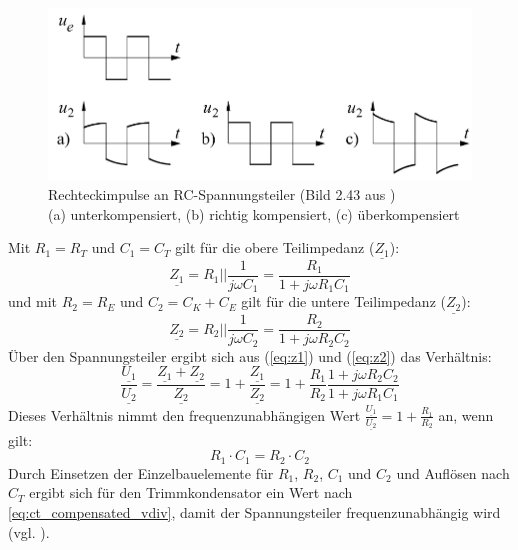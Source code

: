 \documentclass[a4paper, portrait, 12pt]{scrartcl} %
\begin{document}
\begin{figure}[H]
	\centering
		\includegraphics[scale=0.5]{freq_compensated_time_schruefer.png} 
		\caption{\centering Rechteckimpulse an RC-Spannungsteiler (Bild 2.43 aus \cite[S. 106]{Schruefer2022})\\ \footnotesize (a) unterkompensiert, (b) richtig kompensiert, (c) überkompensiert}
	\label{fig:freq_compensated_time}
\end{figure}


Mit $R_1=R_T$ und $C_1=C_T$ gilt für die obere Teilimpedanz ($\underline{Z_1}$):
\begin{equation}
	\underline{Z_1}=R_1||\frac{1}{j\omega C_1}=\frac{R_1}{1+j\omega R_1 C_1}
	\label{eq:z1}
\end{equation}
und mit $R_2=R_E$ und $C_2=C_K+C_E$ gilt für die untere Teilimpedanz ($\underline{Z_2}$):
\begin{equation}
	\underline{Z_2}=R_2||\frac{1}{j\omega C_2}=\frac{R_2}{1+j\omega R_2 C_2}
	\label{eq:z2}
\end{equation}
Über den Spannungsteiler ergibt sich aus (\ref{eq:z1}) und (\ref{eq:z2}) das Verhältnis:
\begin{equation}
	\frac{\underline{U_1}}{\underline{U_2}}=\frac{\underline{Z_1}+\underline{Z_2}}{\underline{Z_2}}=1+\frac{\underline{Z_1}}{\underline{Z_2}}=1+\frac{R_1}{R_2}\frac{1+j\omega R_2 C_2}{1+j\omega R_1 C_1}
	\label{eq:comp_vdiv}
\end{equation}
Dieses Verhältnis nimmt den frequenzunabhängigen Wert $\frac{\underline{U_1}}{\underline{U_2}}=1+\frac{R_1}{R_2}$ an, wenn gilt:
\begin{equation}
	R_1\cdot C_1=R_2\cdot C_2
\end{equation}
Durch Einsetzen der Einzelbauelemente für $R_1$, $R_2$, $C_1$ und $C_2$ und Auflösen nach $C_T$ ergibt sich für den Trimmkondensator ein Wert nach \autoref{eq:ct_compensated_vdiv}, damit der Spannungsteiler frequenzunabhängig wird (vgl. \cite[S. 104-106]{Schruefer2022}).
\end{document}
